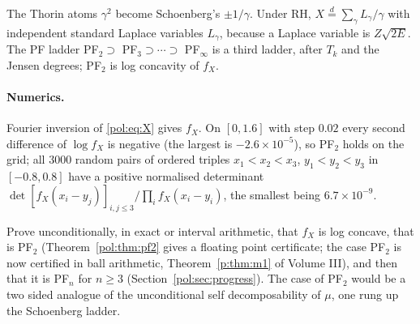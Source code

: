 The Thorin atoms $\gamma^2$ become Schoenberg's $\pm1/\gamma$. Under RH, $X\stackrel{d}{=}\sum_\gamma L_\gamma/\gamma$ with independent standard Laplace variables $L_\gamma$, because a Laplace variable is $Z\sqrt{2E}$. The PF ladder PF$_2\supset$ PF$_3\supset\cdots\supset$ PF$_\infty$ is a third ladder, after $T_k$ and the Jensen degrees; PF$_2$ is log concavity of $f_X$.

\paragraph{Numerics.} Fourier inversion of \eqref{pol:eq:X} gives $f_X$. On $[0,1.6]$ with step $0.02$ every second difference of $\log f_X$ is negative (the largest is $-2.6\times10^{-5}$), so PF$_2$ holds on the grid; all $3000$ random pairs of ordered triples $x_1<x_2<x_3$, $y_1<y_2<y_3$ in $[-0.8,0.8]$ have a positive normalised determinant $\det[f_X(x_i-y_j)]_{i,j\le3}/\prod_if_X(x_i-y_i)$, the smallest being $6.7\times10^{-9}$.

\begin{problem}\label{pol:op:pf2}
Prove unconditionally, in exact or interval arithmetic, that $f_X$ is log concave, that is PF$_2$ (Theorem~\ref{pol:thm:pf2} gives a floating point certificate; the case PF$_2$ is now certified in ball arithmetic, Theorem~\ref{p:thm:m1} of Volume III), and then that it is PF$_n$ for $n\ge3$ (Section~\ref{pol:sec:progress}). The case of PF$_2$ would be a two sided analogue of the unconditional self decomposability of $\mu$, one rung up the Schoenberg ladder.
\end{problem}

